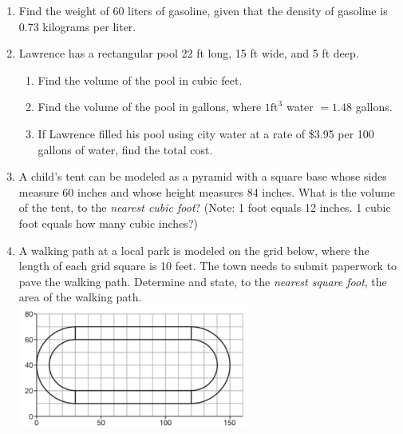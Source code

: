 \documentclass[12pt, twoside]{article}
\begin{document}
\begin{enumerate}
\newpage
\item Find the weight of $60$ liters of gasoline, given that the density of gasoline is $0.73$ kilograms per liter. \vspace{2cm}

\item Lawrence has a rectangular pool 22 ft long, 15 ft wide, and 5 ft deep.
  \begin{enumerate}
    \item Find the volume of the pool in cubic feet. \vspace{3cm}
    \item Find the volume of the pool in gallons, where $1 \mathrm{ ft}^3$ water $= 1.48$ gallons. \vspace{3cm}
    \item If Lawrence filled his pool using city water at a rate of \$3.95 per 100 gallons of water, find the total cost.
  \end{enumerate} \vspace{3cm}

\item A child’s tent can be modeled as a pyramid with a square base whose sides measure 60 inches and whose height measures 84 inches. What is the volume of the tent, to the \emph{nearest cubic foot}? (Note: 1 foot equals 12 inches. 1 cubic foot equals how many cubic inches?) \vspace{4cm}

\newpage
\item A walking path at a local park is modeled on the grid below, where the length of each grid square is 10 feet. The town needs to submit paperwork to pave the walking path. Determine and state, to the \emph{nearest square foot}, the area of the walking path.\\[0.3cm]
    \includegraphics[width=0.6\textwidth]{path_Jan2019-31.png} \vspace{3cm}


\end{enumerate}
\end{document}
